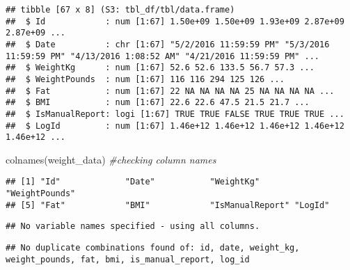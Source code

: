 \documentclass[
]{article}
\newenvironment{Shaded}{\begin{snugshade}}{\end{snugshade}}
\newcommand{\CommentTok}[1]{\textcolor[rgb]{0.56,0.35,0.01}{\textit{#1}}}
\newcommand{\FunctionTok}[1]{\textcolor[rgb]{0.00,0.00,0.00}{#1}}
\newcommand{\NormalTok}[1]{#1}
\newcommand{\OtherTok}[1]{\textcolor[rgb]{0.56,0.35,0.01}{#1}}
\newcommand{\SpecialCharTok}[1]{\textcolor[rgb]{0.00,0.00,0.00}{#1}}
\newcommand{\StringTok}[1]{\textcolor[rgb]{0.31,0.60,0.02}{#1}}
\begin{document}
\begin{verbatim}
## tibble [67 x 8] (S3: tbl_df/tbl/data.frame)
##  $ Id            : num [1:67] 1.50e+09 1.50e+09 1.93e+09 2.87e+09 2.87e+09 ...
##  $ Date          : chr [1:67] "5/2/2016 11:59:59 PM" "5/3/2016 11:59:59 PM" "4/13/2016 1:08:52 AM" "4/21/2016 11:59:59 PM" ...
##  $ WeightKg      : num [1:67] 52.6 52.6 133.5 56.7 57.3 ...
##  $ WeightPounds  : num [1:67] 116 116 294 125 126 ...
##  $ Fat           : num [1:67] 22 NA NA NA NA 25 NA NA NA NA ...
##  $ BMI           : num [1:67] 22.6 22.6 47.5 21.5 21.7 ...
##  $ IsManualReport: logi [1:67] TRUE TRUE FALSE TRUE TRUE TRUE ...
##  $ LogId         : num [1:67] 1.46e+12 1.46e+12 1.46e+12 1.46e+12 1.46e+12 ...
\end{verbatim}

\begin{Shaded}
\begin{Highlighting}[]
 \FunctionTok{colnames}\NormalTok{(weight\_data)  }\CommentTok{\#checking column names}
\end{Highlighting}
\end{Shaded}

\begin{verbatim}
## [1] "Id"             "Date"           "WeightKg"       "WeightPounds"  
## [5] "Fat"            "BMI"            "IsManualReport" "LogId"
\end{verbatim}

\begin{Shaded}
\end{Shaded}

\begin{verbatim}
## No variable names specified - using all columns.
\end{verbatim}

\begin{verbatim}
## No duplicate combinations found of: id, date, weight_kg, weight_pounds, fat, bmi, is_manual_report, log_id
\end{verbatim}
\end{document}
